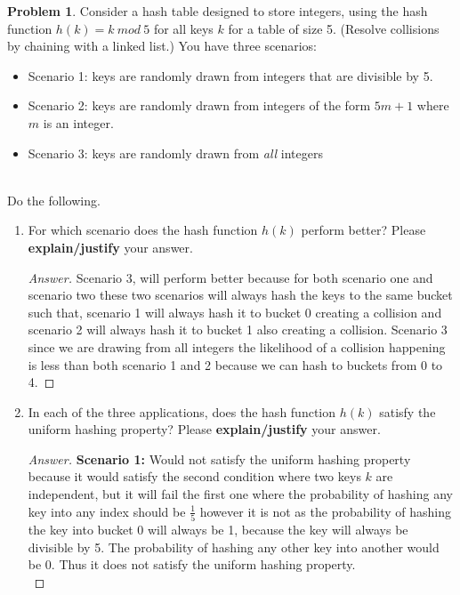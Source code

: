 \documentclass[11pt]{article}
\theoremstyle{definition}
\theoremstyle{definition}
\newtheorem{required}{Problem}
\theoremstyle{definition}
\newcommand{\standard}{26}
\begin{document}
\setcounter{required}{\standard-1}
\begin{required} 
Consider a hash table designed to store integers, using the hash function $h(k)=k~mod~5$ for all keys $k$ for a table of size 5. (Resolve collisions by chaining with a linked list.) You have three scenarios: 
\begin{itemize}
\item Scenario 1: keys are randomly drawn from integers that are divisible by 5.

\item Scenario 2: keys are randomly drawn from integers of the form $5m+1$ where $m$ is an integer.

\item Scenario 3: keys are randomly drawn from \emph{all} integers
\end{itemize}


\noindent \\ Do the following.
\begin{enumerate}[label=(\alph*)]
\item For which scenario does the hash function $h(k)$ perform better? Please  {\bf explain/justify} your answer.


\begin{proof}[Answer]
Scenario 3, will perform better because for both scenario one and scenario two these two scenarios will always hash the keys to the same bucket such that, scenario 1 will always hash it to bucket 0 creating a collision and scenario 2 will always hash it to bucket 1 also creating a collision. Scenario 3 since we are drawing from all integers the likelihood of a collision happening is less than both scenario 1 and 2 because we can hash to buckets from 0 to 4.
\end{proof}

\newpage

\item In each of the three applications, does the hash function $h(k)$ satisfy the uniform hashing property? Please {\bf explain/justify} your answer.

\begin{proof}[Answer]
\textbf{Scenario 1:} Would not satisfy the uniform hashing property because it would satisfy the second condition where two keys $k$ are independent, but it will fail the first one where the probability of hashing any key into any index should be $\frac{1}{5}$ however it is not as the probability of hashing the key into bucket 0 will always be 1, because the key will always be divisible by 5. The probability of hashing any other key into another would be 0. Thus it does not satisfy the uniform hashing property. \\


\end{proof}
\end{enumerate}
\end{required}
\end{document}

